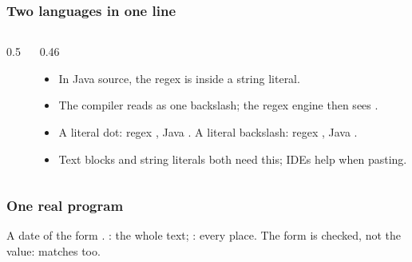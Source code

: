 \documentclass[aspectratio=169,10pt,compress]{beamer}
\begin{document}
\begin{frame}[t,fragile] \frametitle{Two languages in one line}
  \begin{columns}[T]
    \begin{column}{0.5\textwidth}
      \begin{center}
      \end{center}
    \end{column}
    \begin{column}{0.46\textwidth}
      \begin{itemize}\small
        \item In Java source, the regex is inside a string literal.
        \item The compiler reads \hCode{\textbackslash\textbackslash} as one backslash; the regex engine then sees .
        \item A literal dot: regex , Java . A literal backslash: regex \hCode{\textbackslash\textbackslash}, Java .
        \item Text blocks and string literals both need this; IDEs help when pasting.
      \end{itemize}
    \end{column}
  \end{columns}
\end{frame}




\begin{frame}[t,fragile] \frametitle{One real program}

  \vspace{0.2em}
  \small A date of the form . : the whole text; : every place. The form is checked, not the value:  matches too.
\end{frame}
\end{document}
